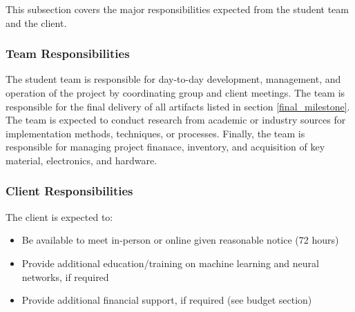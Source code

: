 This subsection covers the major responsibilities expected from the 
student team and the client.

\subsubsection{Team Responsibilities}
The student team is responsible for day-to-day development, management, and
operation of the project by coordinating group and client meetings. The
team is responsible for the final delivery of all artifacts listed in section
\ref{final_milestone}.
The team is expected to conduct research from academic or industry sources
for implementation methods, techniques, or processes.
Finally, the team is responsible for managing project finanace, inventory,
and acquisition of key material, electronics, and hardware.

\subsubsection{Client Responsibilities}
The client is expected to:
\begin{itemize}
\item Be available to meet in-person or online given reasonable notice (72 hours)
\item Provide additional education/training on machine learning and neural networks, if required
\item Provide additional financial support, if required (see budget section)
\end{itemize}
